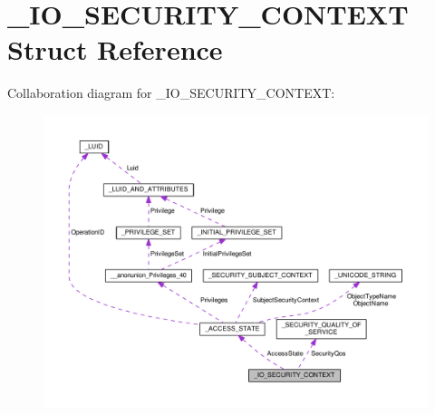 \hypertarget{struct__IO__SECURITY__CONTEXT}{}\section{\+\_\+\+I\+O\+\_\+\+S\+E\+C\+U\+R\+I\+T\+Y\+\_\+\+C\+O\+N\+T\+E\+X\+T Struct Reference}
\label{struct__IO__SECURITY__CONTEXT}


Collaboration diagram for \+\_\+\+I\+O\+\_\+\+S\+E\+C\+U\+R\+I\+T\+Y\+\_\+\+C\+O\+N\+T\+E\+X\+T\+:
\nopagebreak
\begin{figure}[H]
\begin{center}
\leavevmode
\includegraphics[width=350pt]{struct__IO__SECURITY__CONTEXT__coll__graph}
\end{center}
\end{figure}
